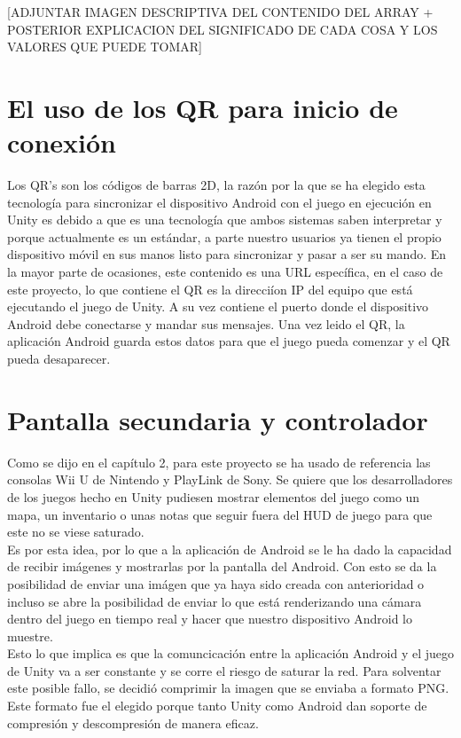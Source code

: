 [ADJUNTAR IMAGEN DESCRIPTIVA DEL CONTENIDO DEL ARRAY + POSTERIOR EXPLICACION DEL SIGNIFICADO DE CADA COSA Y LOS VALORES QUE PUEDE TOMAR]

\section{El uso de los QR para inicio de conexi\'on}
\label{cap4:QR}

Los QR's son los c\'odigos de barras 2D, la raz\'on por la que se ha elegido esta tecnolog\'ia para sincronizar el dispositivo Android con el juego en ejecuci\'on en Unity es debido a que es una tecnolog\'ia que ambos sistemas saben interpretar y porque actualmente es un est\'andar, a parte nuestro usuarios ya tienen el propio dispositivo m\'ovil en sus manos listo para sincronizar y pasar a ser su mando. En la mayor parte de ocasiones, este contenido es una URL espec\'ifica, en el caso de este proyecto, lo que contiene el QR es la direcci\'ion IP del equipo que est\'a ejecutando el juego de Unity. A su vez contiene el puerto donde el dispositivo Android debe conectarse y mandar sus mensajes. Una vez leido el QR, la aplicaci\'on Android guarda estos datos para que el juego pueda comenzar y el QR pueda desaparecer. 
\\

\section{Pantalla secundaria y controlador}
\label{cap4:pantallasecundaria}

Como se dijo en el cap\'itulo 2, para este proyecto se ha usado de referencia las consolas Wii U de Nintendo y PlayLink de Sony. Se quiere que los desarrolladores de los juegos hecho en Unity pudiesen mostrar elementos del juego como un mapa, un inventario o unas notas que seguir fuera del HUD de juego para que este no se viese saturado.
\\
Es por esta idea, por lo que a la aplicaci\'on de Android se le ha dado la capacidad de recibir im\'agenes y mostrarlas por la pantalla del Android. Con esto se da la posibilidad de enviar una im\'agen que ya haya sido creada con anterioridad o incluso se abre la posibilidad de enviar lo que est\'a renderizando una c\'amara dentro del juego en tiempo real y hacer que nuestro dispositivo Android lo muestre. 
\\
Esto lo que implica es que la comuncicaci\'on entre la aplicaci\'on Android y el juego de Unity va a ser constante y se corre el riesgo de saturar la red. Para solventar este posible fallo, se decidi\'o comprimir la imagen que se enviaba a formato PNG. Este formato fue el elegido porque tanto Unity como Android dan soporte de compresi\'on y descompresi\'on de manera eficaz. 



